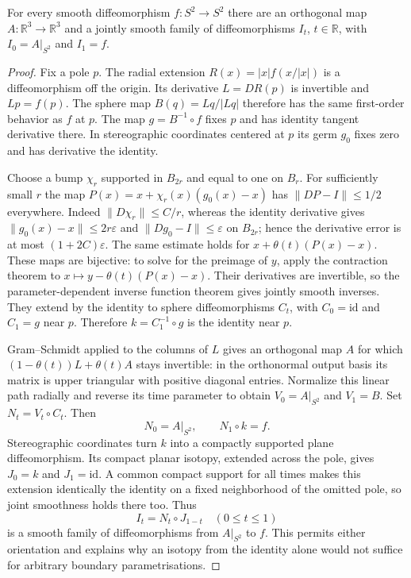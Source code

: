 \begin{lemma}
\label{lem:neck-cap-sphere-isotopy}
For every smooth diffeomorphism $f:S^2\to S^2$ there are an orthogonal
map $A:\mathbb R^3\to\mathbb R^3$ and a jointly smooth family of
diffeomorphisms $I_t$, $t\in\mathbb R$, with $I_0=A|_{S^2}$ and $I_1=f$.
\end{lemma}

\begin{proof}
Fix a pole $p$.  The radial extension
$R(x)=|x|f(x/|x|)$ is a diffeomorphism off the origin.  Its derivative
$L=DR(p)$ is invertible and $Lp=f(p)$.  The sphere map
$B(q)=Lq/|Lq|$ therefore has the same first-order behavior as $f$ at
$p$.  The map $g=B^{-1}\circ f$ fixes $p$ and has identity tangent
derivative there.  In stereographic coordinates centered at $p$ its
germ $g_0$ fixes zero and has derivative the identity.

Choose a bump $\chi_r$ supported in $B_{2r}$ and equal to one on
$B_r$.  For sufficiently small $r$ the map
$P(x)=x+\chi_r(x)(g_0(x)-x)$ has $\|DP-I\|\le1/2$ everywhere.
Indeed $\|D\chi_r\|\le C/r$, whereas the identity derivative gives
$\|g_0(x)-x\|\le2r\varepsilon$ and $\|Dg_0-I\|\le\varepsilon$
on $B_{2r}$; hence the derivative error is at most
$(1+2C)\varepsilon$.  The same estimate holds for
$x+\theta(t)(P(x)-x)$.  These maps are bijective: to solve for the
preimage of $y$, apply the contraction theorem to
$x\mapsto y-\theta(t)(P(x)-x)$.  Their derivatives are invertible, so
the parameter-dependent inverse function theorem gives jointly smooth
inverses.  They extend by the identity to sphere diffeomorphisms $C_t$,
with $C_0=\mathrm{id}$ and $C_1=g$ near $p$.  Therefore
$k=C_1^{-1}\circ g$ is the identity near $p$.

Gram--Schmidt applied to the columns of $L$ gives an orthogonal map
$A$ for which $(1-\theta(t))L+\theta(t)A$ stays invertible: in the
orthonormal output basis its matrix is upper triangular with positive
diagonal entries.  Normalize this linear path radially and reverse
its time parameter to obtain $V_0=A|_{S^2}$ and $V_1=B$.
Set $N_t=V_t\circ C_t$.  Then
\[
 N_0=A|_{S^2},\qquad N_1\circ k=f.
\]
Stereographic coordinates turn $k$ into a compactly supported plane
diffeomorphism.  Its compact planar isotopy, extended across the pole,
gives $J_0=k$ and $J_1=\mathrm{id}$.  A common compact support for all
times makes this extension identically the identity on a fixed
neighborhood of the omitted pole, so joint smoothness holds there too.
Thus
\[
 I_t=N_t\circ J_{1-t}\quad(0\le t\le1)
\]
is a smooth family of diffeomorphisms from $A|_{S^2}$ to $f$.  This permits
either orientation and explains why an isotopy from the identity alone
would not suffice for arbitrary boundary parametrisations.
\end{proof}

